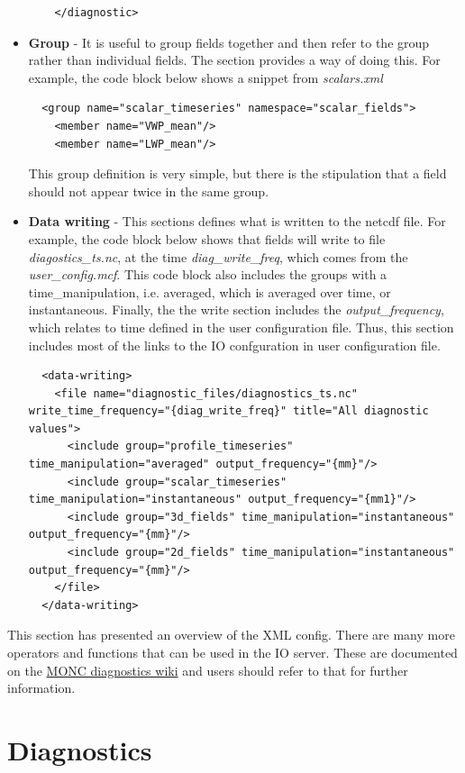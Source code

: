 \documentclass[a4paper,11pt]{article}
\begin{document}
\begin{itemize}
{\begin{lstlisting}
    </diagnostic>
  \end{lstlisting}
  }
  \item{{\bf{Group}} - It is useful to group fields together and then refer to
  the group rather than individual fields. The section provides a way of doing
  this. For example, the code block below shows a snippet from
  \emph{scalars.xml}
  \begin{lstlisting}
  <group name="scalar_timeseries" namespace="scalar_fields">
    <member name="VWP_mean"/>
    <member name="LWP_mean"/>
  \end{lstlisting}
  This group definition is very simple, but there is the stipulation that a
  field should not appear twice in the same group.
  }
  \item {{\bf{Data writing}} - This sections defines what is written to the netcdf
  file. For example, the code block below shows that fields will write to
  file \emph{diagostics\_ts.nc}, at the time \emph{diag\_write\_freq}, which comes
  from the \emph{user\_config.mcf}. This code block also includes the groups
  with a time\_manipulation, i.e. averaged, which is averaged over time, or
  instantaneous. Finally, the the write section includes the \emph{output\_frequency},
  which relates to time defined in the user configuration file. Thus, this section
  includes most of the links to the IO confguration in user configuration file.
  \begin{lstlisting}
  <data-writing>
    <file name="diagnostic_files/diagnostics_ts.nc" write_time_frequency="{diag_write_freq}" title="All diagnostic values">
      <include group="profile_timeseries" time_manipulation="averaged" output_frequency="{mm}"/>
      <include group="scalar_timeseries" time_manipulation="instantaneous" output_frequency="{mm1}"/>
      <include group="3d_fields" time_manipulation="instantaneous" output_frequency="{mm}"/>
      <include group="2d_fields" time_manipulation="instantaneous" output_frequency="{mm}"/>
    </file>
  </data-writing>
  \end{lstlisting}
  }
\end{itemize}

This section has presented an overview of the XML config. There are many more
operators and functions that can be used in the IO server. These are documented
on the {\href{https://code.metoffice.gov.uk/trac/monc/wiki/MoncDoc/Diagnostics}
{MONC diagnostics wiki}} and users should refer to that for further information.

\section{Diagnostics}
\end{document}
